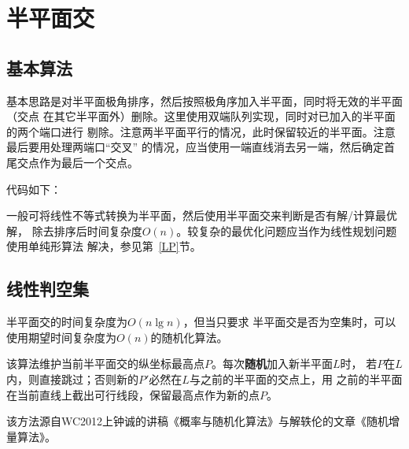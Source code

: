 \section{半平面交}
\subsection{基本算法}
基本思路是对半平面极角排序，然后按照极角序加入半平面，同时将无效的半平面（交点
在其它半平面外）删除。这里使用双端队列实现，同时对已加入的半平面的两个端口进行
剔除。注意两半平面平行的情况，此时保留较近的半平面。注意最后要用处理两端口``交叉''
的情况，应当使用一端直线消去另一端，然后确定首尾交点作为最后一个交点。

代码如下：


一般可将线性不等式转换为半平面，然后使用半平面交来判断是否有解/计算最优解，
除去排序后时间复杂度$O(n)$。较复杂的最优化问题应当作为线性规划问题使用单纯形算法
解决，参见第~\ref{LP}节。
\subsection{线性判空集}
半平面交的时间复杂度为$O(n\lg n)$，但当只要求
半平面交是否为空集时，可以使用期望时间复杂度为$O(n)$的随机化算法。

该算法维护当前半平面交的纵坐标最高点$P$。每次{\bfseries 随机}加入新半平面$L$时，
若$P$在$L$内，则直接跳过；否则新的$P'$必然在$L$与之前的半平面的交点上，用
之前的半平面在当前直线上截出可行线段，保留最高点作为新的点$P$。

该方法源自WC2012上钟诚的讲稿《概率与随机化算法》与解轶伦的文章《随机增量算法》。
